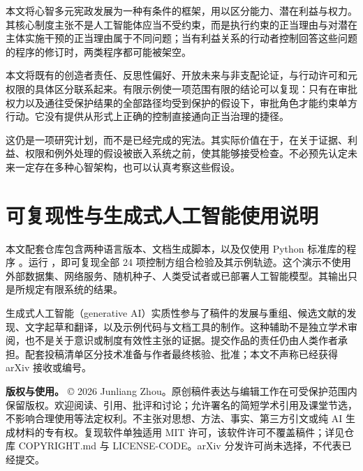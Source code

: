 \documentclass[11pt,a4paper,fontset=fandol]{ctexart}
\begin{document}
本文将心智多元宪政发展为一种有条件的框架，用以区分能力、潜在利益与权力。其核心制度主张不是人工智能体应当不受约束，而是执行约束的正当理由与对潜在主体实施干预的正当理由属于不同问题；当有利益关系的行动者控制回答这些问题的程序的修订时，两类程序都可能被架空。

本文将既有的创造者责任、反思性偏好、开放未来与非支配论证，与行动许可和元权限的具体区分联系起来。有限示例使一项范围有限的结论可以复现：只有在审批权力以及通往受保护结果的全部路径均受到保护的假设下，审批角色才能约束单方行动。它没有提供从形式上正确的控制直接通向正当治理的捷径。

这仍是一项研究计划，而不是已经完成的宪法。其实际价值在于，在关于证据、利益、权限和例外处理的假设被嵌入系统之前，使其能够接受检查。不必预先认定未来一定存在多种心智架构，也可以认真考察这些假设。

\hypertarget{section-14}{%
\section{可复现性与生成式人工智能使用说明}\label{section-14}}

本文配套仓库包含两种语言版本、文档生成脚本，以及仅使用 Python 标准库的程序 。运行 ，即可复现全部 24 项控制方组合检验及其示例轨迹。这个演示不使用外部数据集、网络服务、随机种子、人类受试者或已部署人工智能模型。其输出只是所规定有限系统的结果。

生成式人工智能（generative AI）实质性参与了稿件的发展与重组、候选文献的发现、文字起草和翻译，以及示例代码与文档工具的制作。这种辅助不是独立学术审阅，也不是关于意识或制度有效性主张的证据。提交作品的责任仍由人类作者承担。配套投稿清单区分技术准备与作者最终核验、批准；本文不声称已经获得 arXiv 接收或编号。

\textbf{版权与使用。} © 2026 Junliang Zhou。原创稿件表达与编辑工作在可受保护范围内保留版权。欢迎阅读、引用、批评和讨论；允许署名的简短学术引用及课堂节选，不影响合理使用等法定权利。不主张对思想、方法、事实、第三方引文或纯 AI 生成材料的专有权。复现软件单独适用 MIT 许可，该软件许可不覆盖稿件；详见仓库 COPYRIGHT.md 与 LICENSE-CODE。arXiv 分发许可尚未选择，不代表已经提交。
\end{document}
